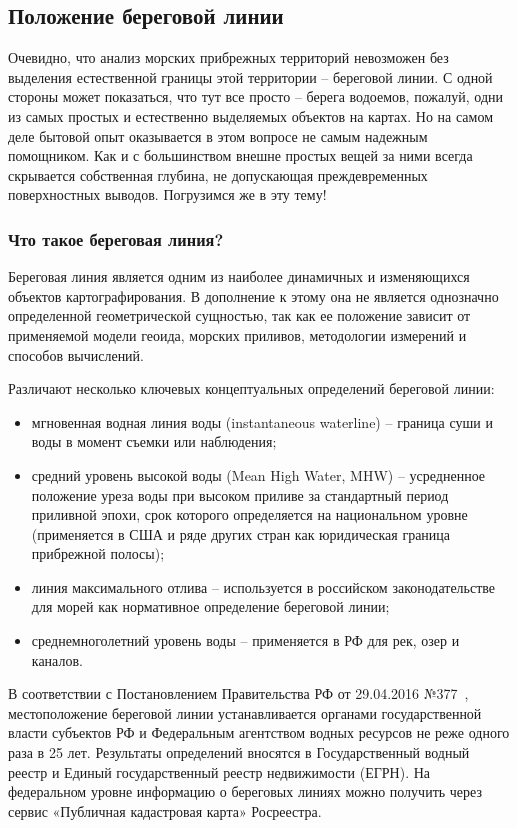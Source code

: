 
\subsection{Положение береговой линии}

Очевидно, что анализ морских прибрежных территорий невозможен без выделения естественной границы этой территории -- береговой линии.
С одной стороны может показаться, что тут все просто -- берега водоемов, пожалуй, одни из самых простых и естественно выделяемых объектов на картах.
Но на самом деле бытовой опыт оказывается в этом вопросе не самым надежным помощником.
Как и с большинством внешне простых вещей за ними всегда скрывается собственная глубина, не допускающая преждевременных поверхностных выводов.
Погрузимся же в эту тему!

\subsubsection{Что такое береговая линия?}

Береговая линия является одним из наиболее динамичных и изменяющихся объектов картографирования.
В дополнение к этому она не является однозначно определенной геометрической сущностью, так как ее  положение зависит от применяемой модели геоида, морских приливов, методологии измерений и способов вычислений. 

Различают несколько ключевых концептуальных определений береговой линии:
\begin{itemize}
    \item мгновенная водная линия воды (instantaneous waterline) -- граница суши и воды в момент съемки или наблюдения;
    \item средний уровень высокой воды (Mean High Water, MHW) -- усредненное положение уреза воды при высоком приливе за стандартный период приливной эпохи, срок которого определяется на национальном уровне (применяется в США и ряде других стран как юридическая граница прибрежной полосы);
    \item линия максимального отлива -- используется в российском законодательстве для морей как нормативное определение береговой линии;
    \item среднемноголетний уровень воды -- применяется в РФ для рек, озер и каналов.
\end{itemize}

В соответствии с Постановлением Правительства РФ от 29.04.2016 №377~\cite{postanovlenie_pravitelstva_rf_377_2016}, местоположение береговой линии устанавливается органами государственной власти субъектов РФ и Федеральным агентством водных ресурсов не реже одного раза в 25 лет.
Результаты определений вносятся в Государственный водный реестр и Единый государственный реестр недвижимости (ЕГРН). 
На федеральном уровне информацию о береговых линиях можно получить через сервис «Публичная кадастровая карта» Росреестра.

